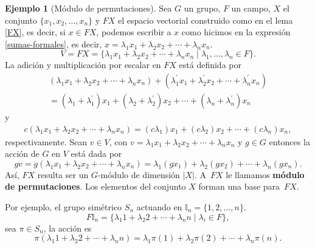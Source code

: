 \documentclass[12pt]{book}
\theoremstyle{definition}
\newtheorem{example}[theorem]{Ejemplo}
\newcounter{in}
\newcounter{ini}
\begin{document}
\begin{example}[Módulo de permutaciones]
  \label{CS}
  Sea $G$ un grupo, $F$ un campo, $X$ el conjunto $\{x_{1},x_{2},\ldots,x_{n}\}$ y $FX$ el
  espacio vectorial construido como en el lema \ref{FX}, es decir,
  si $x\in FX$, podemos escribir a $x$ como hicimos en la expresión
\ref{sumas-formales}, es decir,
$x=\lambda_{1}x_{1}+\lambda_{2}x_{2}+\cdots+\lambda_{n}x_{n}$.
  \begin{equation*}
    V=FX=\{\lambda_{1}x_{1}+\lambda_{2}x_{2}+\cdots
    +\lambda_{n}x_{n}\mid\lambda_{1},\ldots,\lambda_{n}\in F\}.
  \end{equation*}
  La adición y multiplicación por escalar
  en $FX$ está definida por
  \begin{eqnarray*}
    (\lambda_{1}x_{1}+\lambda_{2}x_{2}+\cdots
    +\lambda_{n}x_{n})+(\lambda^{'}_{1}x_{1}+\lambda^{'}_{2}x_{2}+\cdots +\lambda^{'}_{n}x_{n})\\
    =(\lambda_{1}+\lambda^{'}_{1})x_{1}+(\lambda_{2}+\lambda^{'}_{2})x_{2}+\cdots
    +(\lambda_{n}+\lambda^{'}_{n})x_{n}
  \end{eqnarray*}
  y
  \begin{eqnarray*}
    c(\lambda_{1}x_{1}+\lambda_{2}x_{2}+\cdots +\lambda_{n}x_{n})=(c\lambda_{1})x_{1}+(c\lambda_{2})x_{2}+\cdots +(c\lambda_{n})x_{n},
  \end{eqnarray*}
  respectivamente. Sean $v\in V$, con
  $v=\lambda_{1}x_{1}+\lambda_{2}x_{2}+\cdots+\lambda_{n}x_{n}$ y
  $g\in G$ entonces la acción de $G$ en $V$ está dada por
  \begin{equation*}
    gv=g(\lambda_{1}x_{1}+\lambda_{2}x_{2}+\cdots +\lambda_{n}x_{n})=\lambda_{1}(gx_{1})+\lambda_{2}(gx_{2})+\cdots +\lambda_{n}(gx_{n}).
  \end{equation*}
  Así, $FX$ resulta ser un $G$-módulo de dimensión $|X|$. A~$FX$ le llamamos
  \textbf{módulo de permutaciones}. Los elementos del conjunto $X$ forman una base para~$FX$.

  Por ejemplo, el grupo simétrico $S_{n}$ actuando en $\mathbb{I}_{n}=\{1,2,\ldots,n\}$.
  \begin{equation*}
    F\mathbb{I}_{n}=\{\lambda_{1}1+\lambda_{2}2+\cdots+\lambda_{n}n\mid
    \lambda_{i}\in F\},
  \end{equation*}
  sea $\pi\in S_{n}$, la acción es
  \begin{equation*}
    \pi(\lambda_{1}1+\lambda_{2}2+\cdots+\lambda_{n}n)=\lambda_{1}\pi(1)+\lambda_{2}\pi(2)+\cdots+\lambda_{n}\pi(n).
  \end{equation*}


\end{example}
\end{document}
